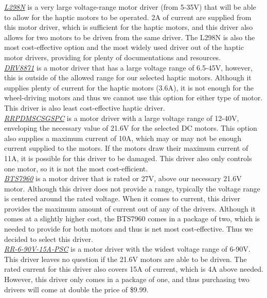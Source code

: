 \noindent \underline{\textit{L298N}} is a very large voltage-range motor driver (from 5-35V) that will be able to allow for the haptic motors to be operated. 2A of current are supplied from this motor driver, which is sufficient for the haptic motors, and this driver also allows for two motors to be driven from the same driver. The L298N is also the most cost-effective option and the most widely used driver out of the haptic motor drivers, providing for plenty of documentations and resources.\\

 \noindent \underline{\textit{DRV8871}} is a motor driver that has a large voltage range of 6.5-45V, however, this is outside of the allowed range for our selected haptic motors. Although it supplies plenty of current for the haptic motors (3.6A), it is not enough for the wheel-driving motors and thus we cannot use this option for either type of motor. This driver is also least cost-effective haptic driver.\\
 
 \noindent \underline{\textit{RRPDMSCSGSPC}} is a motor driver with a large voltage range of 12-40V, enveloping the necessary value of 21.6V for the selected DC motors. This option also supplies a maximum current of 10A, which may or may not be enough current supplied to the motors. If the motors draw their maximum current of 11A, it is possible for this driver to be damaged. This driver also only controls one motor, so it is not the most cost-efficient.\\
 
 \noindent \underline{\textit{BTS7960}} is a motor driver that is rated or 27V, above our necessary 21.6V motor. Although this driver does not provide a range, typically the voltage range is centered around the rated voltage. When it comes to current, this driver provides the maximum amount of current out of any of the drivers. Although it comes at a slightly higher cost, the BTS7960 comes in a package of two, which is needed to provide for both motors and thus is net most cost-effective. Thus we decided to select this driver.\\
 
 \noindent \underline{\textit{RR-6-90V-15A-PSC}} is a motor driver with the widest voltage range of 6-90V. This driver leaves no question if the 21.6V motors are able to be driven. The rated current for this driver also covers 15A of current, which is 4A above needed. However, this driver only comes in a package of one, and thus purchasing two drivers will come at double the price of \$9.99.\\